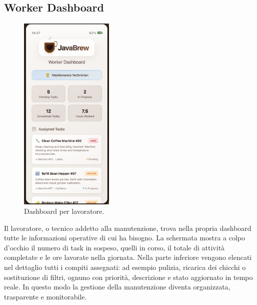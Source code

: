 \subsection{Worker Dashboard}
\begin{figure}[H]
    \centering
    \includegraphics[width=0.4\textwidth]{./assets/worker.png}
    \caption{Dashboard per lavoratore.}
\end{figure}
Il lavoratore, o tecnico addetto alla manutenzione, trova nella propria dashboard tutte le informazioni operative di cui ha bisogno. La schermata mostra a colpo d’occhio il numero di task in sospeso, quelli in corso, il totale di attività completate e le ore lavorate nella giornata. Nella parte inferiore vengono elencati nel dettaglio tutti i compiti assegnati: ad esempio pulizia, ricarica dei chicchi o sostituzione di filtri, ognuno con priorità, descrizione e stato aggiornato in tempo reale. In questo modo la gestione della manutenzione diventa organizzata, trasparente e monitorabile.

